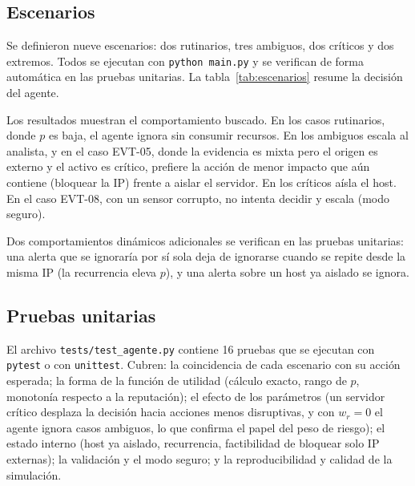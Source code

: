 \documentclass[11pt,a4paper]{article}
\begin{document}
\subsection{Escenarios}

Se definieron nueve escenarios: dos rutinarios, tres ambiguos, dos críticos y dos extremos. Todos se ejecutan con \texttt{python main.py} y se verifican de forma automática en las pruebas unitarias. La tabla~\ref{tab:escenarios} resume la decisión del agente.

\begin{table}[H]
\centering
\caption{Resultados de los escenarios de prueba. $p$ es la probabilidad de amenaza estimada y $U^*$ la utilidad de la acción elegida.}\label{tab:escenarios}
\scriptsize

\end{table}

Los resultados muestran el comportamiento buscado. En los casos rutinarios, donde $p$ es baja, el agente ignora sin consumir recursos. En los ambiguos escala al analista, y en el caso EVT-05, donde la evidencia es mixta pero el origen es externo y el activo es crítico, prefiere la acción de menor impacto que aún contiene (bloquear la IP) frente a aislar el servidor. En los críticos aísla el host. En el caso EVT-08, con un sensor corrupto, no intenta decidir y escala (modo seguro).

Dos comportamientos dinámicos adicionales se verifican en las pruebas unitarias: una alerta que se ignoraría por sí sola deja de ignorarse cuando se repite desde la misma IP (la recurrencia eleva $p$), y una alerta sobre un host ya aislado se ignora.

\subsection{Pruebas unitarias}

El archivo \texttt{tests/test\_agente.py} contiene 16 pruebas que se ejecutan con \texttt{pytest} o con \texttt{unittest}. Cubren: la coincidencia de cada escenario con su acción esperada; la forma de la función de utilidad (cálculo exacto, rango de $p$, monotonía respecto a la reputación); el efecto de los parámetros (un servidor crítico desplaza la decisión hacia acciones menos disruptivas, y con $w_r=0$ el agente ignora casos ambiguos, lo que confirma el papel del peso de riesgo); el estado interno (host ya aislado, recurrencia, factibilidad de bloquear solo IP externas); la validación y el modo seguro; y la reproducibilidad y calidad de la simulación.
\end{document}
